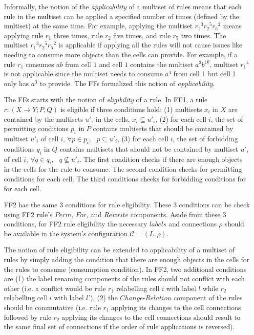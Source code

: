 \documentclass{article}
\newcommand{\mn}{\text{-}}
\newcommand{\s}{\text{ }}
\newcommand{\ra}{\rightarrow}
\begin{document}
Informally, the notion of the \emph{applicability} of a multiset of rules means that each rule in
the multiset can be applied a specified number of times (defined by the multiset) at the same time.
For example, applying the multiset ${r_1}^3{r_2}^5{r_5}^2$ means applying rule $r_1$ three times, 
rule $r_2$ five times, and rule $r_5$ two times. The multiset ${r_1}^3{r_2}^5{r_5}^2$ is applicable
if applying all the rules will not cause issues like needing to consume more objects than the cells
can provide. For example, if a rule $r_1$ consumes $ab$ from cell $1$ and cell $1$ contains the 
multiset $a^3b^{10}$, multiset ${r_1}^4$ is not applicable since the multiset needs to consume $a^4$
from cell 1 but cell 1 only has $a^3$ to provide.  The FFs formalized this notion of 
\emph{applicability}.

The FFs starts with the notion of \emph{eligibility} of a rule. In FF1, a rule 
$r:(X \ra Y;P,Q)$ is eligible if three conditions hold: (1) multisets $x_i$ in $X$ are contained by 
the multisets $u'_i$ in the cells, $x_i \subseteq u'_i$, (2) for each cell $i$, the set of 
permitting conditions $p_i$ in $P$ contains multisets that should be contained by multiset $u'_i$ of 
cell $i$,  $\forall p \in p_i,\s p \subseteq u'_i$, (3) for each cell $i$, the set of forbidding
conditions $q_i$ in $Q$ contains multisets that should not be contained by multiset $u'_i$ of cell
$i$, $\forall q \in q_i,\s q \not\subseteq u'_i$. The first condition checks if there are enough
objects in the cells for the rule to consume. The second condition checks for permitting conditions
for each cell. The third conditions checks for forbidding conditions for for each cell.

FF2 has the same 3 conditions for rule eligibility. These 3 conditions can be check using FF2 rule's
$Perm$, $For$, and $Rewrite$ components. Aside from these 3 conditions, for FF2 rule eligibility the
necessary $labels$ and connections $\rho$ should be available in the system's configuration 
$\mathcal{C}=(L, \rho)$.

The notion of rule eligibility can be extended to applicability of a multiset of rules by
simply adding the condition that there are enough objects in the cells for the rules to consume 
(consumption condition). In FF2, two additional conditions are (1) the label renaming components of 
the rules should not conflict with each other (i.e. a conflict would be rule $r_1$ relabelling cell 
$i$ with label $l$ while $r_2$ relabelling cell $i$ with label $l'$), (2) the $Change\mn Relation$ 
component of the rules should be commutative (i.e. rule $r_1$ applying its changes to the cell 
connections followed by rule $r_2$ applying its changes to the cell connections should result to the
same final set of connections if the order of rule applications is reversed). 
\end{document}
